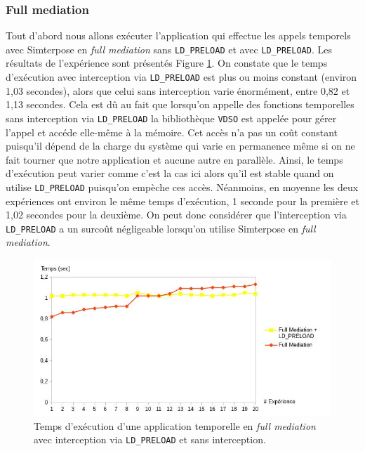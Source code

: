 \subsubsection{Full mediation}
 Tout d'abord nous allons exécuter l'application qui effectue les appels temporels avec Simterpose en \textit{full mediation} sans \texttt{LD\_PRELOAD} et avec \texttt{LD\_PRELOAD}. Les résultats de l'expérience sont présentés Figure \ref{Temps_FM}. On constate que le temps d'exécution avec interception via \texttt{LD\_PRELOAD} est plus ou moins constant (environ 1,03 secondes), alors que celui sans interception varie énormément, entre 0,82 et 1,13 secondes. Cela est dû au fait que lorsqu'on appelle des fonctions temporelles sans interception via \texttt{LD\_PRELOAD} la bibliothèque \texttt{VDSO} est appelée pour gérer l'appel et accéde elle-même à la mémoire. Cet accès n'a pas un coût constant puisqu'il dépend de la charge du système qui varie en permanence même si on ne fait tourner que notre application et aucune autre en parallèle. Ainsi, le temps d'exécution peut varier comme c'est la cas ici alors qu'il est stable quand on utilise \texttt{LD\_PRELOAD} puisqu'on empèche ces accès. Néanmoins, en moyenne les deux expériences ont environ le même temps d'exécution, 1 seconde pour la première et 1,02 secondes pour la deuxième. On peut donc considérer que l'interception via \texttt{LD\_PRELOAD} a un surcoût négligeable lorsqu'on utilise Simterpose en \textit{full mediation}.

\begin{figure}[H]
  \centering
    \includegraphics[scale=0.50]{mesures/graph/Temps_FM.jpg}
    \caption[Temps d'exécution d'une application temporelle en \textit{full mediation}] {Temps d'exécution d'une application temporelle en \textit{full mediation} avec interception via \texttt{LD\_PRELOAD} et sans interception.}
    \label{Temps_FM}
\end{figure}

